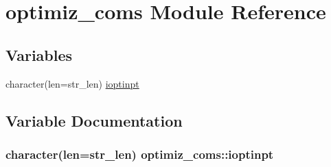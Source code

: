 \hypertarget{namespaceoptimiz__coms}{}\section{optimiz\+\_\+coms Module Reference}
\label{namespaceoptimiz__coms}
\subsection*{Variables}
\begin{DoxyCompactItemize}
\item 
character(len=str\+\_\+len) \hyperlink{namespaceoptimiz__coms_a237b5bc7b92d46fc8943bc78fa9a3b5f}{ioptinpt}
\end{DoxyCompactItemize}


\subsection{Variable Documentation}
\subsubsection[{\texorpdfstring{ioptinpt}{ioptinpt}}]{\setlength{\rightskip}{0pt plus 5cm}character(len=str\+\_\+len) optimiz\+\_\+coms\+::ioptinpt}\hypertarget{namespaceoptimiz__coms_a237b5bc7b92d46fc8943bc78fa9a3b5f}{}\label{namespaceoptimiz__coms_a237b5bc7b92d46fc8943bc78fa9a3b5f}
